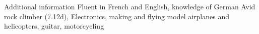 \begin{rubric}{Additional information}
\entry*[Languages]%
  Fluent in French and English, knowledge of German
%
%
\entry*[Hobbies]%
  Avid rock climber (7.12d), Electronics,
  making and flying model airplanes and helicopters,
  guitar,
  motorcycling
%
%
\end{rubric}
